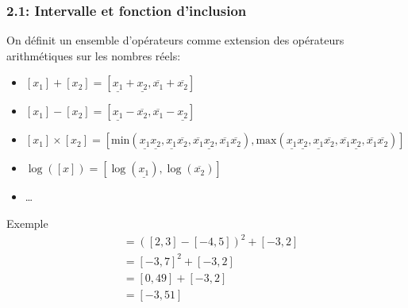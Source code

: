 \documentclass{beamer}
\begin{document}
\begin{frame}
{\begin{figure}[H]
            \caption{}
            \label{fig:fct2}
        \end{figure}
    }
\end{frame}


\begin{frame}
    \frametitle{2.1: Intervalle et fonction d'inclusion}
    On définit un ensemble d'opérateurs comme extension des opérateurs arithmétiques sur les nombres réels:

    \small
    \begin{itemize}
        \item $[x_1] + [x_2] = [\underline{x_1} + \underline{x_2}, \overline{x_1} + \overline{x_2}]$
        \item $[x_1] - [x_2] = [\underline{x_1} - \overline{x_2}, \overline{x_1} - \underline{x_2}]$
        \item $[x_1] \times [x_2] = [\text{min}(\underline{x_1}\underline{x_2}, \underline{x_1}\overline{x_2}, \overline{x_1}\underline{x_2}, \overline{x_1}\overline{x_2}), \text{max}(\underline{x_1}\underline{x_2}, \underline{x_1}\overline{x_2}, \overline{x_1}\underline{x_2}, \overline{x_1}\overline{x_2})]$
        \item $\log([x]) = [\log(\underline{x_1}), \log(\overline{x_2})]$
        \item \dots
    \end{itemize}

    \begin{block}{Exemple}
        \begin{align}
            [z] &= ([2, 3] - [-4, 5])^2 + [-3, 2] \nonumber \\
                &= [-3,7]^2 + [-3, 2] \nonumber \\
                &= [0, 49] + [-3, 2] \nonumber \\
                &= [-3, 51] \nonumber
        \end{align}
    \end{block}
\end{frame}
\end{document}
